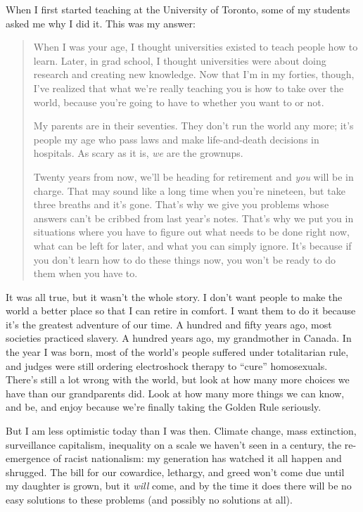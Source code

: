 
When I first started teaching at the University of Toronto,
some of my students asked me why I did it.
This was my answer:

\begin{quote}

When I was your age,
I thought universities existed to teach people how to learn.
Later,
in grad school,
I thought universities were about doing research and creating new knowledge.
Now that I'm in my forties,
though,
I've realized that what we're really teaching you is
how to take over the world,
because you're going to have to whether you want to or not.

My parents are in their seventies.
They don't run the world any more;
it's people my age who pass laws
and make life-and-death decisions in hospitals.
As scary as it is,
\emph{we} are the grownups.

Twenty years from now,
we'll be heading for retirement and \emph{you} will be in charge.
That may sound like a long time when you're nineteen,
but take three breaths and it's gone.
That's why we give you problems whose answers can't be cribbed from last year's notes.
That's why we put you in situations where
you have to figure out what needs to be done right now,
what can be left for later,
and what you can simply ignore.
It's because if you don't learn how to do these things now,
you won't be ready to do them when you have to.

\end{quote}

It was all true,
but it wasn't the whole story.
I don't want people to make the world a better place so that I can retire in comfort.
I want them to do it because it's the greatest adventure of our time.
A hundred and fifty years ago,
most societies practiced slavery.
A hundred years ago,
my grandmother  in Canada.
In the year I was born,
most of the world's people suffered under totalitarian rule,
and judges were still ordering electroshock therapy to ``cure'' homosexuals.
There's still a lot wrong with the world,
but look at how many more choices we have than our grandparents did.
Look at how many more things we can know, and be, and enjoy
because we're finally taking the Golden Rule seriously.

But I am less optimistic today than I was then.
Climate change,
mass extinction,
surveillance capitalism,
inequality on a scale we haven't seen in a century,
the re-emergence of racist nationalism:
my generation has watched it all happen and shrugged.
The bill for our cowardice, lethargy, and greed won't come due until my daughter is grown,
but it \emph{will} come,
and by the time it does there will be no easy solutions to these problems
(and possibly no solutions at all).

